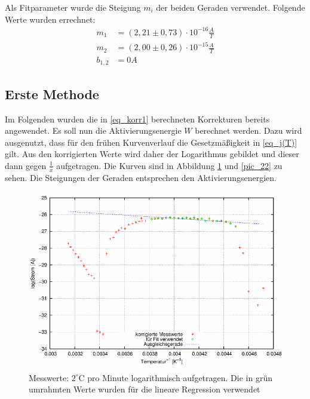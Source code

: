 Als Fitparameter wurde die Steigung $m_i$ der beiden Geraden verwendet. Folgende Werte wurden errechnet:\\
\begin{align}
m_1&=(2,21     \pm 0,73) \cdot10^{-16} \frac{A}{T}\\
\label{eq_korr1}
m_2&=( 2,00  \pm0,26)\cdot10^{-15}\frac{A}{T}\\
b_{1,2}&=0 A
\end{align}

\subsection{Erste Methode}
Im Folgenden wurden die in \eqref{eq_korr1} berechneten Korrekturen bereits angewendet. Es soll nun die Aktivierungsenergie $W$ berechnet werden. Dazu wird ausgenutzt, dass für den frühen Kurvenverlauf die Gesetzmäßigkeit in \eqref{eq_j(T)} gilt. Aus den korrigierten Werte wird daher der Logarithmus gebildet und dieser dann gegen $\frac{1}{x}$ aufgetragen. Die Kurven sind in Abbildung \ref{pic_21} und \ref{pic_22} zu sehen. Die Steigungen der Geraden entsprechen den Aktivierungsenergien.\\

\begin{figure}[H]
\includegraphics[scale=0.8]{../gnu/relax21.pdf}
\caption{Messwerte: $2^\circ$C pro Minute logarithmisch aufgetragen. Die in grün umrahmten Werte wurden für die lineare Regression verwendet}
\label{pic_21}
\end{figure}

